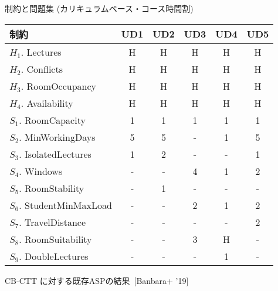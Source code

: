 \documentclass[11pt,dvipdfmx]{beamer}
\begin{document}
\begin{frame}{制約と問題集 (カリキュラムベース・コース時間割)}
  \begin{block}{}\small
    \begin{center}
      \begin{tabular}{l|ccccc}%
        制約                      &  UD1  &  UD2  &  UD3  &  UD4  &  UD5  \\
        \hline
        $H_1$. Lectures           &  H    &  H    &  H    &  H    &  H    \\
        $H_2$. Conflicts          &  H    &  H    &  H    &  H    &  H    \\
        $H_3$. RoomOccupancy      &  H    &  H    &  H    &  H    &  H    \\
        $H_4$. Availability       &  H    &  H    &  H    &  H    &  H    \\
        $S_1$. RoomCapacity       &  1    &  1    &  1    &  1    &  1    \\
        $S_2$. MinWorkingDays     &  5    &  5    &  -    &  1    &  5    \\
        $S_3$. IsolatedLectures   &  1    &  2    &  -    &  -    &  1    \\
        $S_4$. Windows            &  -    &  -    &  4    &  1    &  2    \\
        $S_5$. RoomStability      &  -    &  1    &  -    &  -    &  -    \\
        $S_6$. StudentMinMaxLoad  &  -    &  -    &  2    &  1    &  2    \\
        $S_7$. TravelDistance     &  -    &  -    &  -    &  -    &  2    \\
        $S_8$. RoomSuitability    &  -    &  -    &  3    &  H    &  -    \\
        $S_9$. DoubleLectures     &  -    &  -    &  -    &  1    &  -  
      \end{tabular}
    \end{center}
  \end{block}
\end{frame}
\begin{frame}{CB-CTT に対する既存ASPの結果~[Banbara+ '19]}
  \centering
  \scriptsize
  \begin{tableC}
    
  \end{tableC}
\end{frame}
\end{document}

